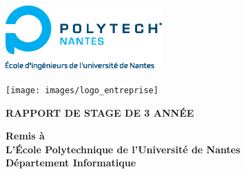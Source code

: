 
\begin{titlepage}	%

\begin{center}


\begin{minipage}[t]{0.48\textwidth}
	\begin{flushleft}
		\includegraphics [width=60mm]{images/logo_ecoles/Polytech_Nantes_Universite} \\[0.5cm]
	\end{flushleft}
\end{minipage}
\begin{minipage}[t]{0.48\textwidth}
	\begin{flushright}
		\texttt{[image: images/logo\_entreprise]} \\[0.5cm]
	\end{flushright}
\end{minipage} 

\vfill

\LARGE{\textbf{RAPPORT DE STAGE DE 3 ANNÉE}} 

\vfill

\Large{\textbf{Remis à}} \\
\LARGE{\textbf{L'École Polytechnique de l'Université de Nantes\\Département Informatique}} 

\vfill 

\end{center}
\end{titlepage}
